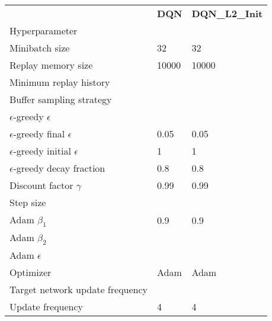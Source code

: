 \begin{tabular}{lll}
 & \bfseries DQN & \bfseries DQN_L2_Init \\
Hyperparameter &  &  \\
Minibatch size & 32 & 32 \\
Replay memory size & 10000 & 10000 \\
Minimum replay history &  &  \\
Buffer sampling strategy &  &  \\
$\epsilon$-greedy $\epsilon$ &  &  \\
$\epsilon$-greedy final $\epsilon$ & 0.05 & 0.05 \\
$\epsilon$-greedy initial $\epsilon$ & 1 & 1 \\
$\epsilon$-greedy decay fraction & 0.8 & 0.8 \\
Discount factor $\gamma$ & 0.99 & 0.99 \\
Step size &  &  \\
Adam $\beta_1$ & 0.9 & 0.9 \\
Adam $\beta_2$ &  &  \\
Adam $\epsilon$ &  &  \\
Optimizer & Adam & Adam \\
Target network update frequency &  &  \\
Update frequency & 4 & 4 \\
\end{tabular}

